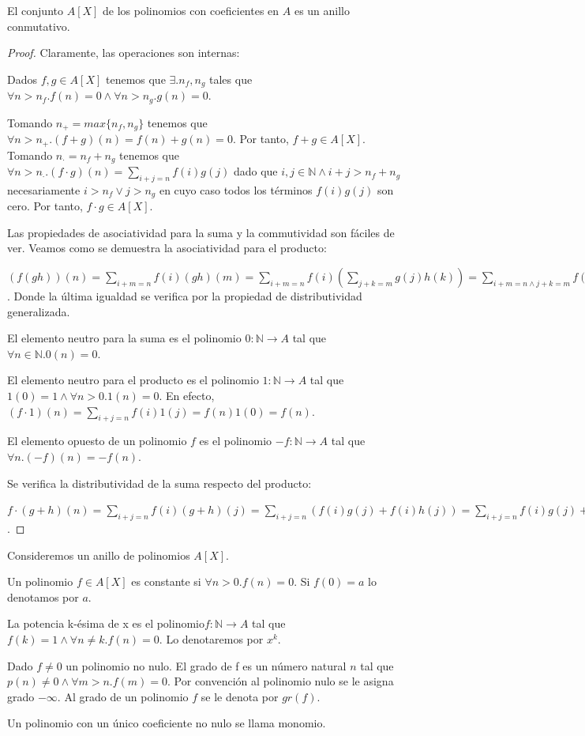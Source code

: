\begin{proposition}
El conjunto $A[X]$ de los polinomios con coeficientes en $A$ es un anillo conmutativo. 
\end{proposition}
\begin{proof}
Claramente, las operaciones son internas:

Dados $f,g \in A[X]$ tenemos que $\exists. n_f,n_g$ tales que $\forall n > n_f. f(n) = 0 \land \forall n > n_g. g(n) = 0$. 

Tomando $n_+ = max\{n_f,n_g\}$ tenemos que $\forall n > n_+. (f+g)(n) = f(n)+g(n) = 0$. Por tanto, $f+g \in A[X]$. 
Tomando $n_\cdot = n_f + n_g$ tenemos que $\forall n > n_\cdot. (f \cdot g)(n) = \sum_{i+j = n} f(i)g(j)$ dado que $i,j \in \mathbb{N} \land i+j > n_f + n_g$ necesariamente $i > n_f \lor j > n_g$ en cuyo caso todos los términos $f(i)g(j)$ son cero. Por tanto, $f \cdot g \in A[X]$. 

Las propiedades de asociatividad para la suma y la commutividad son fáciles de ver. Veamos como se demuestra la asociatividad para el producto:

$(f(gh))(n) = \sum_{i+m = n} f(i)(gh)(m) = \sum_{i+m = n} f(i) (\sum_{j+k = m} g(j)h(k)) = \sum_{i+m = n \land j+k = m} f(i)g(j)h(k) = \sum_{i+j+k = m} f(i)g(j)h(k)$. Donde la última igualdad se verifica por la propiedad de distributividad generalizada. 

El elemento neutro para la suma es el polinomio $0: \mathbb{N} \to A$ tal que $\forall n \in \mathbb{N}. 0(n) = 0$. 

El elemento neutro para el producto es el polinomio $1:\mathbb{N} \to A$ tal que $1(0) = 1 \land \forall n > 0. 1(n) = 0$. En efecto, $(f\cdot 1)(n) = \sum_{i+j = n} f(i)1(j) = f(n)1(0) = f(n)$. 

El elemento opuesto de un polinomio $f$ es el polinomio $-f: \mathbb{N} \to A$ tal que $\forall n. (-f)(n) = -f(n)$. 

Se verifica la distributividad de la suma respecto del producto:

$f \cdot (g+h)(n) = \sum_{i+j = n} f(i) (g+h)(j) = \sum_{i+j = n} (f(i)g(j) + f(i)h(j)) = \sum_{i+j = n} f(i)g(j) + \sum_{i+j = n} f(i)h(j) = (f\cdot g + f \cdot h)(n)$.  
\end{proof}

\begin{definition}
Consideremos un anillo de polinomios $A[X]$. 

Un polinomio $f \in A[X]$ es constante si $\forall n > 0. f(n) = 0$. Si $f(0) = a$ lo denotamos por $a$. 

La potencia k-ésima de x es el polinomio$f: \mathbb{N} \to A$ tal que $f(k) = 1 \land \forall n \neq k. f(n) = 0$. Lo denotaremos por $x^k$. 

Dado $f \neq 0$ un polinomio no nulo. El grado de f es un número natural $n$ tal que $p(n) \neq 0 \land \forall m > n. f(m) = 0$. Por convención al polinomio nulo se le asigna grado $-\infty$.  Al grado de un polinomio $f$ se le denota por $gr(f)$. 

Un polinomio con un único coeficiente no nulo se llama monomio. 
\end{definition}

